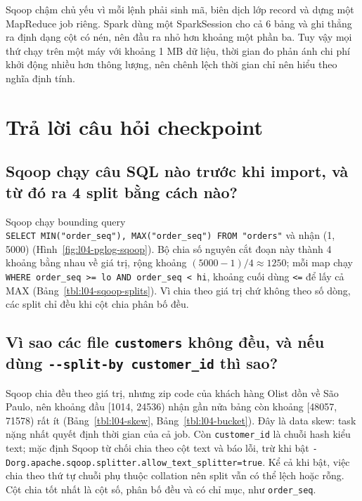 \documentclass[
  12pt,
  a4paper,
]{report}
\begin{document}
Sqoop chậm chủ yếu vì mỗi lệnh phải sinh mã, biên dịch lớp record và
dựng một MapReduce job riêng. Spark dùng một SparkSession cho cả 6 bảng
và ghi thẳng ra định dạng cột có nén, nên đầu ra nhỏ hơn khoảng một phần
ba. Tuy vậy mọi thứ chạy trên một máy với khoảng 1 MB dữ liệu, thời gian
đo phản ánh chi phí khởi động nhiều hơn thông lượng, nên chênh lệch thời
gian chỉ nên hiểu theo nghĩa định tính.

\section{Trả lời câu hỏi checkpoint}\label{sec:l04-discussion}

\subsection{Sqoop chạy câu SQL nào trước khi import, và từ đó ra 4 split
bằng cách nào?}\label{sec:l04-q1}

Sqoop chạy bounding query
\texttt{SELECT\ MIN("order\_}\allowbreak{}\texttt{seq"),}\allowbreak{}\texttt{\ MAX("order\_}\allowbreak{}\texttt{seq")\ FROM\ "orders"}\allowbreak{}
và nhận (1, 5000) (Hình~\ref{fig:l04-pglog-sqoop}). Bộ chia số nguyên
cắt đoạn này thành 4 khoảng bằng nhau về giá trị, rộng khoảng
\((5000-1)/4 \approx 1250\); mỗi map chạy
\texttt{WHERE\ order\_}\allowbreak{}\texttt{seq\ \textgreater{}=}\allowbreak{}\texttt{\ lo\ AND\ order\_}\allowbreak{}\texttt{seq\ \textless{}\ hi}\allowbreak{},
khoảng cuối dùng \texttt{\textless{}=} để lấy cả MAX
(Bảng~\ref{tbl:l04-sqoop-splits}). Vì chia theo giá trị chứ không theo
số dòng, các split chỉ đều khi cột chia phân bố đều.

\subsection{\texorpdfstring{Vì sao các file \texttt{customers} không
đều, và nếu dùng
\texttt{-\/-split-by\ customer\_}\allowbreak{}\texttt{id}\allowbreak{}
thì
sao?}{Vì sao các file customers không đều, và nếu dùng -\/-split-by customer\_id thì sao?}}\label{sec:l04-q2}

Sqoop chia đều theo giá trị, nhưng zip code của khách hàng Olist dồn về
São Paulo, nên khoảng đầu {[}1014, 24536) nhận gần nửa bảng còn khoảng
{[}48057, 71578) rất ít (Bảng~\ref{tbl:l04-skew},
Bảng~\ref{tbl:l04-bucket}). Đây là data skew: task nặng nhất quyết định
thời gian của cả job. Còn \texttt{customer\_id} là chuỗi hash kiểu text;
mặc định Sqoop từ chối chia theo cột text và báo lỗi, trừ khi bật
\texttt{-Dorg.}\allowbreak{}\texttt{apache.}\allowbreak{}\texttt{sqoop.}\allowbreak{}\texttt{splitter.}\allowbreak{}\texttt{allow\_}\allowbreak{}\texttt{text\_}\allowbreak{}\texttt{splitter=}\allowbreak{}\texttt{true}\allowbreak{}.
Kể cả khi bật, việc chia theo thứ tự chuỗi phụ thuộc collation nên split
vẫn có thể lệch hoặc rỗng. Cột chia tốt nhất là cột số, phân bố đều và
có chỉ mục, như \texttt{order\_seq}.
\end{document}

